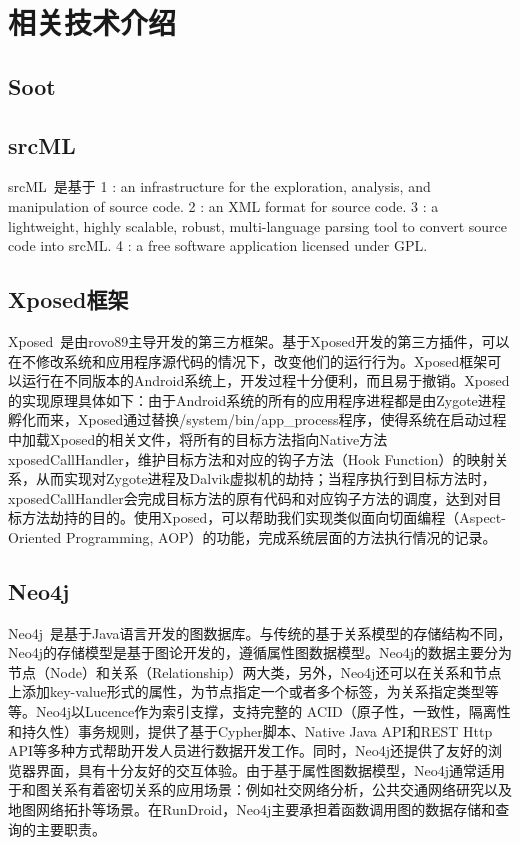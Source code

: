 \section{相关技术介绍}

\subsection{Soot}

\subsection{srcML}
srcML~\cite{collard2013srcml}是基于
1 : an infrastructure for the exploration, analysis, and manipulation of source code.
2 : an XML format for source code.
3 : a lightweight, highly scalable, robust, multi-language parsing tool to convert source code into srcML.
4 : a free software application licensed under GPL.


\subsection{Xposed框架}
Xposed~\cite{Xposed}是由rovo89主导开发的第三方框架。基于Xposed开发的第三方插件，可以在不修改系统和应用程序源代码的情况下，改变他们的运行行为。Xposed框架可以运行在不同版本的Android系统上，开发过程十分便利，而且易于撤销。Xposed的实现原理具体如下：由于Android系统的所有的应用程序进程都是由Zygote进程孵化而来，Xposed通过替换/system/bin/app\_process程序，使得系统在启动过程中加载Xposed的相关文件，将所有的目标方法指向Native方法xposedCallHandler，维护目标方法和对应的钩子方法（Hook Function）的映射关系，从而实现对Zygote进程及Dalvik虚拟机的劫持；当程序执行到目标方法时，xposedCallHandler会完成目标方法的原有代码和对应钩子方法的调度，达到对目标方法劫持的目的。使用Xposed，可以帮助我们实现类似面向切面编程（Aspect-Oriented Programming, AOP）的功能，完成系统层面的方法执行情况的记录。
\subsection{Neo4j}
Neo4j~\cite{Neo4jthe19}是基于Java语言开发的图数据库。与传统的基于关系模型的存储结构不同，Neo4j的存储模型是基于图论开发的，遵循属性图数据模型。Neo4j的数据主要分为节点（Node）和关系（Relationship）两大类，另外，Neo4j还可以在关系和节点上添加key-value形式的属性，为节点指定一个或者多个标签，为关系指定类型等等。Neo4j以Lucence作为索引支撑，支持完整的 ACID（原子性，一致性，隔离性和持久性）事务规则，提供了基于Cypher脚本、Native Java API和REST Http API等多种方式帮助开发人员进行数据开发工作。同时，Neo4j还提供了友好的浏览器界面，具有十分友好的交互体验。由于基于属性图数据模型，Neo4j通常适用于和图关系有着密切关系的应用场景：例如社交网络分析，公共交通网络研究以及地图网络拓扑等场景。在RunDroid，Neo4j主要承担着函数调用图的数据存储和查询的主要职责。

